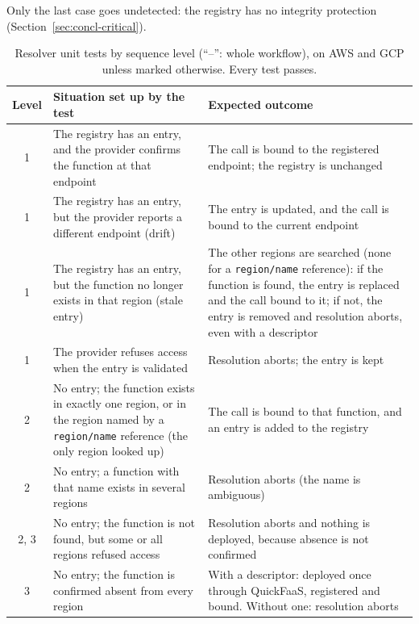 \noindent Only the last case goes undetected: the registry has no integrity protection
(Section~\ref{sec:concl-critical}).

\begin{table}[!htbp]
  \centering
  \caption{Resolver unit tests by sequence level (``--'': whole workflow), on AWS and GCP unless
  marked otherwise. Every test passes.}
  \label{tab:eval-correctness}
  \small
  \begin{tabular}{|c|>{\raggedright\arraybackslash}p{}|>{\raggedright\arraybackslash}p{}|}
    \hline
    \textbf{Level} & \textbf{Situation set up by the test} & \textbf{Expected outcome} \\
    \hline
    1 & The registry has an entry, and the provider confirms the function at that endpoint &
    The call is bound to the registered endpoint; the registry is unchanged \\
    \hline
    1 & The registry has an entry, but the provider reports a different endpoint (drift) &
    The entry is updated, and the call is bound to the current endpoint \\
    \hline
    1 & The registry has an entry, but the function no longer exists in that region (stale
    entry) & The other regions are searched (none for a \texttt{region/name} reference): if the
    function is found, the entry is replaced and the call bound to it; if not, the entry is removed and resolution aborts, even with a
    descriptor \\
    \hline
    1 & The provider refuses access when the entry is validated & Resolution aborts; the entry is
    kept \\
    \hline
    2 & No entry; the function exists in exactly one region, or in the region named by a
    \texttt{region/name} reference (the only region looked up) & The call is bound to that
    function, and an entry is added to the registry \\
    \hline
    2 & No entry; a function with that name exists in several regions & Resolution aborts (the
    name is ambiguous) \\
    \hline
    2, 3 & No entry; the function is not found, but some or all regions refused access &
    Resolution aborts and nothing is deployed, because absence is not confirmed \\
    \hline
    3 & No entry; the function is confirmed absent from every region & With a descriptor: deployed
    once through QuickFaaS, registered and bound. Without one: resolution aborts \\

\end{tabular}
\end{table}

